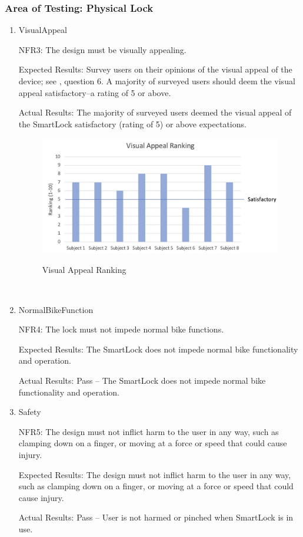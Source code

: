 \documentclass[12pt, titlepage]{article}
\begin{document}
\subsubsection{Area of Testing: Physical Lock}
\begin{enumerate}

\item{VisualAppeal

NFR3: The design must be visually appealing.}

Expected Results: Survey users on their opinions of the visual appeal of the device; see , question 6. A majority of surveyed users should deem the visual appeal satisfactory--a rating of 5 or above.

Actual Results: The majority of surveyed users deemed the visual appeal of the SmartLock satisfactory (rating of 5) or above expectations. 

 \begin{figure}[h!]
 \begin{center}
 {
 \includegraphics[width=0.65\linewidth]{VisualAppealRanking}
 }
 \caption{\label{VisualAppealRanking} Visual Appeal Ranking}
 \end{center}
 \end{figure}

~\newpage
\item{NormalBikeFunction

NFR4: The lock must not impede normal bike functions. }

Expected Results: The SmartLock does not impede normal bike functionality and operation. 

Actual Results: Pass -- The SmartLock does not impede normal bike functionality and operation. 

\item{Safety

NFR5: The design must not inflict harm to the user in any way, such as clamping down on a finger, or moving at a force or speed that could cause injury. }

Expected Results: The design must not inflict harm to the user in any way, such as clamping down on a finger, or moving at a force or speed that could cause injury. 

Actual Results: Pass -- User is not harmed or pinched when SmartLock is in use. 

\end{enumerate}
\end{document}
